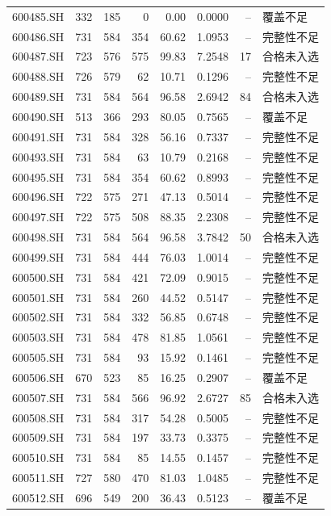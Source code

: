 \documentclass[10pt,a4paper]{article}
\begin{document}
\begin{longtable}{lrrr r r r l}
600485.SH & 332 & 185 & 0 & 0.00 & 0.0000 & -- & 覆盖不足\\
600486.SH & 731 & 584 & 354 & 60.62 & 1.0953 & -- & 完整性不足\\
600487.SH & 723 & 576 & 575 & 99.83 & 7.2548 & 17 & 合格未入选\\
600488.SH & 726 & 579 & 62 & 10.71 & 0.1296 & -- & 完整性不足\\
600489.SH & 731 & 584 & 564 & 96.58 & 2.6942 & 84 & 合格未入选\\
600490.SH & 513 & 366 & 293 & 80.05 & 0.7565 & -- & 覆盖不足\\
600491.SH & 731 & 584 & 328 & 56.16 & 0.7337 & -- & 完整性不足\\
600493.SH & 731 & 584 & 63 & 10.79 & 0.2168 & -- & 完整性不足\\
600495.SH & 731 & 584 & 354 & 60.62 & 0.8993 & -- & 完整性不足\\
600496.SH & 722 & 575 & 271 & 47.13 & 0.5014 & -- & 完整性不足\\
600497.SH & 722 & 575 & 508 & 88.35 & 2.2308 & -- & 完整性不足\\
600498.SH & 731 & 584 & 564 & 96.58 & 3.7842 & 50 & 合格未入选\\
600499.SH & 731 & 584 & 444 & 76.03 & 1.0014 & -- & 完整性不足\\
600500.SH & 731 & 584 & 421 & 72.09 & 0.9015 & -- & 完整性不足\\
600501.SH & 731 & 584 & 260 & 44.52 & 0.5147 & -- & 完整性不足\\
600502.SH & 731 & 584 & 332 & 56.85 & 0.6748 & -- & 完整性不足\\
600503.SH & 731 & 584 & 478 & 81.85 & 1.0561 & -- & 完整性不足\\
600505.SH & 731 & 584 & 93 & 15.92 & 0.1461 & -- & 完整性不足\\
600506.SH & 670 & 523 & 85 & 16.25 & 0.2907 & -- & 覆盖不足\\
600507.SH & 731 & 584 & 566 & 96.92 & 2.6727 & 85 & 合格未入选\\
600508.SH & 731 & 584 & 317 & 54.28 & 0.5005 & -- & 完整性不足\\
600509.SH & 731 & 584 & 197 & 33.73 & 0.3375 & -- & 完整性不足\\
600510.SH & 731 & 584 & 85 & 14.55 & 0.1457 & -- & 完整性不足\\
600511.SH & 727 & 580 & 470 & 81.03 & 1.0485 & -- & 完整性不足\\
600512.SH & 696 & 549 & 200 & 36.43 & 0.5123 & -- & 覆盖不足\\

\end{longtable}
\end{document}
